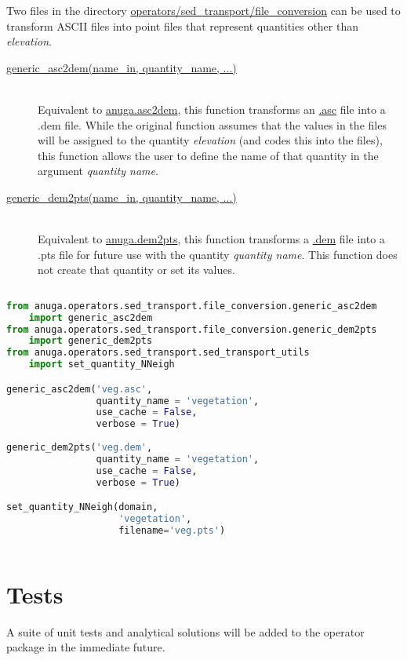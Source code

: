 \documentclass[10pt]{article}
\begin{document}
\noindent Two files in the directory \url{operators/sed_transport/file_conversion} can be used to transform ASCII files into point files that represent quantities other than \textit{elevation}.

\begin{description}
\item[\url{generic_asc2dem(name_in, quantity_name, ...)}] \hfill \\
Equivalent to \url{anuga.asc2dem}, this function transforms an \url{.asc} file into a {.dem} file. While the original function assumes that the values in the files will be assigned to the quantity \textit{elevation} (and codes this into the files), this function allows the user to define the name of that quantity in the argument \textit{quantity name}.

\item[\url{generic_dem2pts(name_in, quantity_name, ...)}] \hfill \\
Equivalent to \url{anuga.dem2pts}, this function transforms a \url{.dem} file into a {.pts} file for future use with the quantity \textit{quantity name}. This function does not create that quantity or set its values.
\end{description}

\begin{lstlisting}[language=Python, caption=Using file conversion and set quantity utilities]
 
from anuga.operators.sed_transport.file_conversion.generic_asc2dem
	import generic_asc2dem 
from anuga.operators.sed_transport.file_conversion.generic_dem2pts
	import generic_dem2pts
from anuga.operators.sed_transport.sed_transport_utils
	import set_quantity_NNeigh

generic_asc2dem('veg.asc',
				quantity_name = 'vegetation',
				use_cache = False,
				verbose = True)
				
generic_dem2pts('veg.dem',
				quantity_name = 'vegetation',
				use_cache = False,
				verbose = True)

set_quantity_NNeigh(domain,
					'vegetation', 
					filename='veg.pts')
    

\end{lstlisting}

\section{Tests}

A suite of unit tests and analytical solutions will be added to the operator package in the immediate future.
\end{document}
